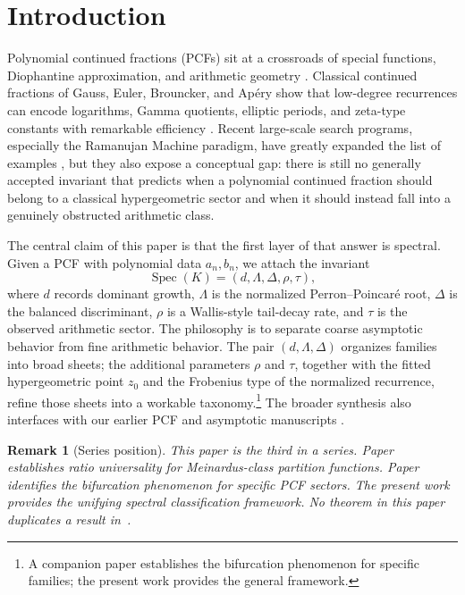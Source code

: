 \documentclass[11pt]{article}
\newtheorem{remark}[theorem]{Remark}
\begin{document}
\section{Introduction}
Polynomial continued fractions (PCFs) sit at a crossroads of special functions, Diophantine approximation, and arithmetic geometry \cite{wall1948,lorentzen2008}. Classical continued fractions of Gauss, Euler, Brouncker, and Ap\'ery show that low-degree recurrences can encode logarithms, Gamma quotients, elliptic periods, and zeta-type constants with remarkable efficiency \cite{apery1979}. Recent large-scale search programs, especially the Ramanujan Machine paradigm, have greatly expanded the list of examples \cite{raayoni2021}, but they also expose a conceptual gap: there is still no generally accepted invariant that predicts when a polynomial continued fraction should belong to a classical hypergeometric sector and when it should instead fall into a genuinely obstructed arithmetic class.

The central claim of this paper is that the first layer of that answer is spectral. Given a PCF with polynomial data $a_n,b_n$, we attach the invariant
\[
\operatorname{Spec}(K)=(d,\Lambda,\Delta,\rho,\tau),
\]
where $d$ records dominant growth, $\Lambda$ is the normalized Perron--Poincar\'e root, $\Delta$ is the balanced discriminant, $\rho$ is a Wallis-style tail-decay rate, and $\tau$ is the observed arithmetic sector. The philosophy is to separate coarse asymptotic behavior from fine arithmetic behavior. The pair $(d,\Lambda,\Delta)$ organizes families into broad sheets; the additional parameters $\rho$ and $\tau$, together with the fitted hypergeometric point $z_0$ and the Frobenius type of the normalized recurrence, refine those sheets into a workable taxonomy.\footnote{A companion paper \cite{pcf_bifurcation_2026} establishes the bifurcation phenomenon for specific families; the present work provides the general framework.} The broader synthesis also interfaces with our earlier PCF and asymptotic manuscripts \cite{pcf_unified_2026,ratio_universality_2026}.

\begin{remark}[Series position]
This paper is the third in a series. Paper~\cite{ratio_universality_2026} establishes ratio universality for Meinardus-class partition functions. Paper~\cite{pcf_bifurcation_2026} identifies the bifurcation phenomenon for specific PCF sectors. The present work provides the unifying spectral classification framework. No theorem in this paper duplicates a result in~\cite{ratio_universality_2026,pcf_bifurcation_2026}.
\end{remark}
\end{document}
